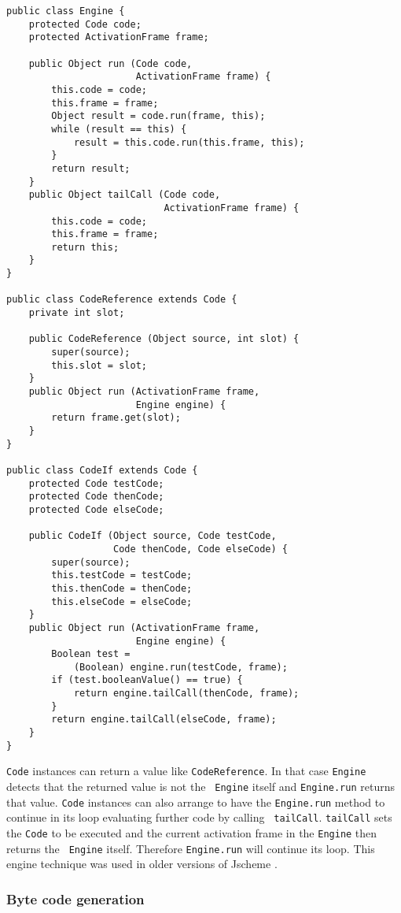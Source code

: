 \documentclass[final]{ieee}
\begin{document}
\small
\begin{verbatim}
public class Engine {
    protected Code code;
    protected ActivationFrame frame;

    public Object run (Code code,
                       ActivationFrame frame) {
        this.code = code;
        this.frame = frame;
        Object result = code.run(frame, this);
        while (result == this) {
            result = this.code.run(this.frame, this);
        }
        return result;
    }
    public Object tailCall (Code code,
                            ActivationFrame frame) {
        this.code = code;
        this.frame = frame;
        return this;
    }
}

public class CodeReference extends Code {
    private int slot;

    public CodeReference (Object source, int slot) {
        super(source);
        this.slot = slot;
    }
    public Object run (ActivationFrame frame,
                       Engine engine) {
        return frame.get(slot);
    }
}

public class CodeIf extends Code {
    protected Code testCode;
    protected Code thenCode;
    protected Code elseCode;

    public CodeIf (Object source, Code testCode,
                   Code thenCode, Code elseCode) {
        super(source);
        this.testCode = testCode;
        this.thenCode = thenCode;
        this.elseCode = elseCode;
    }
    public Object run (ActivationFrame frame,
                       Engine engine) {
        Boolean test = 
            (Boolean) engine.run(testCode, frame);
        if (test.booleanValue() == true) {
            return engine.tailCall(thenCode, frame);
        }
        return engine.tailCall(elseCode, frame);
    }
}
\end{verbatim}
\normalsize

{\tt Code} instances can return a value like {\tt CodeReference}.  In
that case {\tt Engine} detects that the returned value is not the {\tt
Engine} itself and {\tt Engine.run} returns that value.  {\tt Code}
instances can also arrange to have the {\tt Engine.run} method to
continue in its loop evaluating further code by calling {\tt
tailCall}.  {\tt tailCall} sets the {\tt Code} to be executed and the
current activation frame in the {\tt Engine} then returns the {\tt
Engine} itself.  Therefore {\tt Engine.run} will continue its loop.
This engine technique was used in older versions of Jscheme
\cite{JschemeEngine}.

\subsubsection{Byte code generation}
\end{document}
